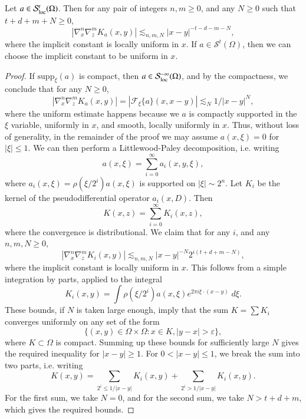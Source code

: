 \begin{theorem}
    Let $a \in \mathcal{S}^t_{\text{loc}}(\Omega)$. Then for any pair of integers $n,m \geq 0$, and any $N \geq 0$ such that $t + d + m + N \geq 0$,
    \[ |\nabla^n_x \nabla^m_z K_a(x,y)| \lesssim_{n,m,N} |x - y|^{-t-d-m-N}, \]
    where the implicit constant is locally uniform in $x$. If $a \in \mathcal{S}^t(\Omega)$, then we can choose the implicit constant to be uniform in $x$.
\end{theorem}
\begin{proof}
    If $\text{supp}_\xi(a)$ is compact, then $a \in \mathcal{S}^{-\infty}_{\text{loc}}(\Omega)$, and by the compactness, we conclude that for any $N \geq 0$,
    \[ |\nabla^n_x \nabla^m_z K_a(x,y)| = |\mathcal{F}_\xi\{ a \} (x,x-y)| \lesssim_N 1 / |x-y|^N, \]
    where the uniform estimate happens because we $a$ is compactly supported in the $\xi$ variable, uniformly in $x$, and smooth, locally uniformly in $x$. Thus, without loss of generality, in the remainder of the proof we may assume $a(x,\xi) = 0$ for $|\xi| \leq 1$. We can then perform a Littlewood-Paley decomposition, i.e. writing
    \[ a(x,\xi) = \sum_{i = 0}^\infty a_i(x,y,\xi), \]
    where $a_i(x,\xi) = \rho(\xi / 2^i) a(x,\xi)$ is supported on $|\xi| \sim 2^n$. Let $K_i$ be the kernel of the pseudodifferential operator $a_i(x,D)$. Then
    \[ K(x,z) = \sum_{i = 0}^\infty K_i(x,z), \]
    where the convergence is distributional. We claim that for any $i$, and any $n,m,N \geq 0$,
    \[ |\nabla^n_x \nabla^m_z K_i(x,y)| \lesssim_{n,m,N} |x-y|^{-N} 2^{i(t + d + m - N)}, \]
    where the implicit constant is locally uniform in $x$. This follows from a simple integration by parts, applied to the integral
    \[ K_i(x,y) = \int \rho(\xi / 2^i) a(x,\xi) e^{2 \pi i \xi \cdot (x-y)}\; d\xi. \]
    These bounds, if $N$ is taken large enough, imply that the sum $K = \sum K_i$ converges uniformly on any set of the form
    \[ \{ (x,y) \in \Omega \times \Omega: x \in K, |y-x| > \varepsilon \}, \]
    where $K \subset \Omega$ is compact. Summing up these bounds for sufficiently large $N$ gives the required inequality for $|x-y| \geq 1$. For $0 < |x-y| \leq 1$, we break the sum into two parts, i.e. writing
    \[ K(x,y) = \sum_{2^i \leq 1/|x-y|} K_i(x,y) + \sum_{2^i > 1/|x-y|} K_i(x,y). \]
    For the first sum, we take $N = 0$, and for the second sum, we take $N > t + d + m$, which gives the required bounds.
\end{proof}

